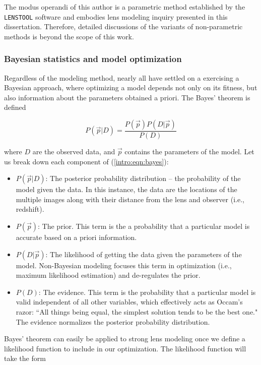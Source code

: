 The modus operandi of this author is a parametric method established by the \texttt{LENSTOOL} software \citet{Jullo:2007lr} and embodies lens modeling inquiry presented in this dissertation. Therefore, detailed discussions of the variants of non-parametric methods is beyond the scope of this work.

\subsubsection{Bayesian statistics and model optimization}

Regardless of the modeling method, nearly all have settled on a exercising a Bayesian approach, where optimizing a model depends not only on its fitness, but also information about the parameters obtained a priori. The Bayes' theorem is defined

\begin{equation}
P(\vec{p} | D ) = \frac{P(\vec{p}) P(D | \vec{p} ) }{P(D)}
\label{intro:eqn:bayes}
\end{equation}

\noindent where $D$ are the observed data, and $\vec{p}$ contains the parameters of the model. Let us break down each component of (\ref{intro:eqn:bayes}):

\begin{itemize}
\item $P(\vec{p} | D )$: The posterior probability distribution -- the probability of the model given the data. In this instance, the data are the locations of the multiple images along with their distance from the lens and observer (i.e., redshift).
\item $P(\vec{p})$: The prior. This term is the a probability that a particular model is accurate based on a priori information.
\item $P(D | \vec{p} )$:  The likelihood of getting the data given the parameters of the model. Non-Bayesian modeling focuses this term in optimization (i.e., maximum likelihood estimation) and de-regulates the prior.
\item $P(D)$: The evidence. This term is the probability that a particular model is valid independent of all other variables, which effectively acts as Occam's razor: ``All things being equal, the simplest solution tends to be the best one." The evidence normalizes the posterior probability distribution.
\end{itemize}

Bayes' theorem can easily be applied to strong lens modeling once we define a likelihood function to include in our optimization. The likelihood function will take the form

